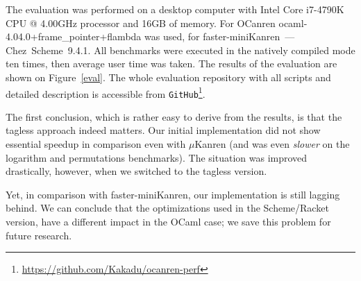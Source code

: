 
The evaluation was performed on a desktop computer with Intel Core i7-4790K CPU @ 4.00GHz processor and 16GB of memory.
For OCanren \mbox{ocaml-4.04.0+frame_pointer+flambda} was used, for faster-miniKanren~--- Chez~Scheme~9.4.1.
All benchmarks were executed in the natively compiled mode ten times, then average user time was taken. The results of the evaluation
are shown on Figure~\ref{eval}. The whole evaluation repository with all scripts and detailed description is accessible
from \lstinline{GitHub}\footnote{\url{https://github.com/Kakadu/ocanren-perf}}.

The first conclusion, which is rather easy to derive from the results, is that the tagless approach indeed matters. Our initial
implementation did not show essential speedup in comparison even with $\mu$Kanren (and was even \emph{slower} on the logarithm
and permutations benchmarks). The situation was improved drastically, however, when we switched to the tagless version.

Yet, in comparison with faster-miniKanren, our implementation is still lagging behind. We can conclude that the optimizations
used in the Scheme/Racket version, have a different impact in the OCaml case; we save this problem for future research.

